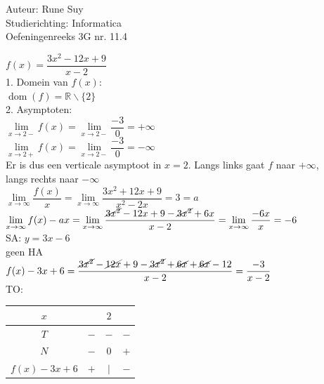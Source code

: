 \documentclass[a4paper]{article}
\newcommand{\limit}{\lim\limits}
\newcommand{\dom}{\operatorname{dom}}
\begin{document}
  
\noindent \large Auteur: Rune Suy \\
\noindent \large Studierichting: Informatica\\
\noindent \large Oefeningenreeks 3G nr. 11.4\\

\medskip

\normalsize

$f(x) = \dfrac{3x^2 - 12x + 9}{x-2}$\\

1. Domein van $f(x)$:\\

$\dom(f) = \mathbb{R}\backslash\{2\}$\\

2. Asymptoten:\\

$\limit_{x \rightarrow 2 -} f(x) = \limit_{x \rightarrow 2 -} \dfrac{-3}{0} = +\infty$\\

$\limit_{x \rightarrow 2 +} f(x) = \limit_{x \rightarrow 2 -} \dfrac{-3}{0} = -\infty$\\

Er is dus een verticale asymptoot in $x = 2$. Langs links gaat $f$ naar $+\infty$, \\

langs rechts naar $-\infty$\\

$\limit_{x \rightarrow \infty} \dfrac{f(x)}{x} = \limit_{x\rightarrow\infty} \dfrac{3x^2 + 12x + 9}{x^2 - 2x} = 3 = a$\\

$\limit_{x \rightarrow \infty} f(x) - ax = \limit_{x\rightarrow \infty} \dfrac{\cancel{3x^2} - 12x + 9 - \cancel{3x^2} + 6x}{x-2} = \limit_{x\rightarrow \infty} \dfrac{-6x}{x} = -6$\\

SA: $y=3x-6$\\

geen HA\\

$f(x) - 3x + 6 = \dfrac{\cancel{3x^2} - \cancel{12x} + 9 - \cancel{3x^2} + \cancel{6x} + \cancel{6x} - 12}{x-2} = \dfrac{-3}{x-2}$\\

TO:\\

\begin{tabular}{c | c c c}
    $x$             &       & $2$   & \\ \hline
    $T$             & $-$   & $-$   & $-$ \\
    $N$             & $-$   & $0$   & $+$ \\ \hline
    $f(x) - 3x + 6$ & $+$   & $|$   & $-$ \\
\end{tabular}
\end{document}
